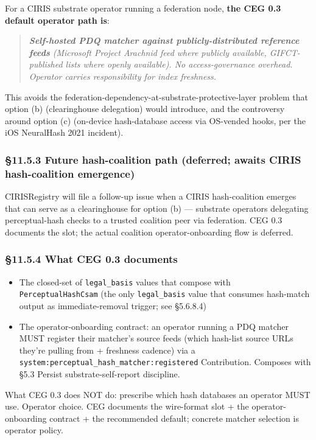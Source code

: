 \documentclass[10pt]{article}
\begin{document}
For a CIRIS substrate operator running a federation node, \textbf{the CEG 0.3 default operator path is}:


\begin{quote}\itshape \textbf{Self-hosted PDQ matcher against publicly-distributed reference feeds} (Microsoft Project Arachnid feed where publicly available, GIFCT-published lists where openly available). No access-governance overhead. Operator carries responsibility for index freshness.\end{quote}


This avoids the federation-dependency-at-substrate-protective-layer problem that option (b) (clearinghouse delegation) would introduce, and the controversy around option (c) (on-device hash-database access via OS-vended hooks, per the iOS NeuralHash 2021 incident).


\subsubsection*{§11.5.3 Future hash-coalition path (deferred; awaits CIRIS hash-coalition emergence)}


CIRISRegistry will file a follow-up issue when a CIRIS hash-coalition emerges that can serve as a clearinghouse for option (b) — substrate operators delegating perceptual-hash checks to a trusted coalition peer via federation. CEG 0.3 documents the slot; the actual coalition operator-onboarding flow is deferred.


\subsubsection*{§11.5.4 What CEG 0.3 documents}


\begin{itemize}\setlength\itemsep{0pt}
\item The closed-set of \texttt{legal\_basis} values that compose with \texttt{PerceptualHashCsam} (the only \texttt{legal\_basis} value that consumes hash-match output as immediate-removal trigger; see §5.6.8.4)
\item The operator-onboarding contract: an operator running a PDQ matcher MUST register their matcher's source feeds (which hash-list source URLs they're pulling from + freshness cadence) via a \texttt{system:perceptual\_hash\_matcher:registered} Contribution. Composes with §5.3 Persist substrate-self-report discipline.
\end{itemize}


What CEG 0.3 does NOT do: prescribe which hash databases an operator MUST use. Operator choice. CEG documents the wire-format slot + the operator-onboarding contract + the recommended default; concrete matcher selection is operator policy.
\end{document}
